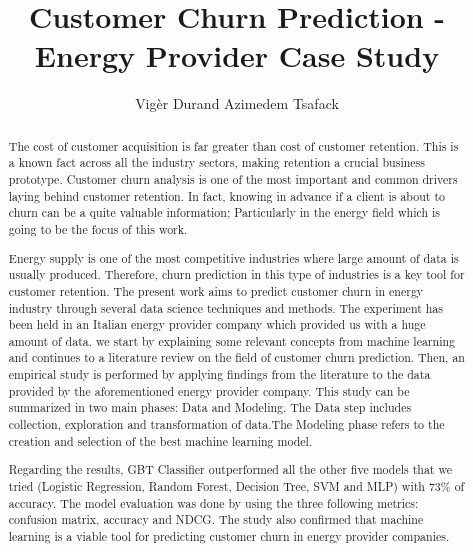 \documentclass[LaM,binding=0.6cm, english]{sapthesis}
\title{Customer Churn Prediction - Energy Provider Case Study}
\author{Vigèr Durand Azimedem Tsafack}
\begin{document}
\frontmatter

\maketitle

\begin{abstract}

\par The cost of customer acquisition is far greater than cost of customer
retention. This is a known fact across all the industry sectors, making retention a crucial business prototype. Customer churn analysis is one of the most important and common drivers laying behind customer retention. In fact, knowing in advance if a client is about to churn can be a quite valuable information; Particularly in the energy field which is going to be the focus of this work.

\par Energy supply is one of the most competitive industries where large amount of data is usually produced. Therefore, churn prediction in this type of industries is a key tool for customer retention. The present work aims to predict customer churn in energy industry through several data science techniques and methods. The experiment has been held in an Italian energy provider company which provided us with a huge amount of data. we start by explaining some relevant concepts from machine learning and continues to a literature review on the field of customer churn prediction. Then, an empirical study is performed by applying findings from the literature to the data provided by the aforementioned energy provider company. This study can be summarized in two main phases: Data and Modeling. The Data step includes collection, exploration and transformation of data.The Modeling phase refers to the creation and selection of the best machine learning model.

\par Regarding the results, \gls{GBT} Classifier outperformed all the other five models that we tried (Logistic Regression, Random Forest, Decision Tree, \gls{SVM} and \gls{MLP}) with 73\% of accuracy. The model evaluation was done by using the three following metrics: confusion matrix, accuracy and \gls{NDCG}. The study also confirmed that machine learning is a viable tool for predicting customer churn in energy provider companies.

\end{abstract}

\tableofcontents
\end{document}

